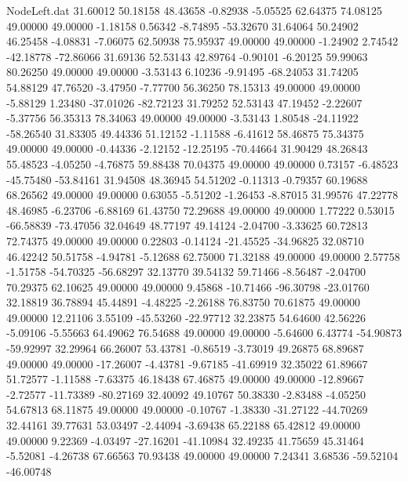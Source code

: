 \begin{filecontents}{NodeLeft.dat}
  31.60012   50.18158   48.43658    -0.82938   -5.05525   62.64375   74.08125   49.00000   49.00000   -1.18158    0.56342   -8.74895  -53.32670
  31.64064   50.24902   46.25458    -4.08831   -7.06075   62.50938   75.95937   49.00000   49.00000   -1.24902    2.74542  -42.18778  -72.86066
  31.69136   52.53143   42.89764    -0.90101   -6.20125   59.99063   80.26250   49.00000   49.00000   -3.53143    6.10236   -9.91495  -68.24053
  31.74205   54.88129   47.76520    -3.47950   -7.77700   56.36250   78.15313   49.00000   49.00000   -5.88129    1.23480  -37.01026  -82.72123
  31.79252   52.53143   47.19452    -2.22607   -5.37756   56.35313   78.34063   49.00000   49.00000   -3.53143    1.80548  -24.11922  -58.26540
  31.83305   49.44336   51.12152    -1.11588   -6.41612   58.46875   75.34375   49.00000   49.00000   -0.44336   -2.12152  -12.25195  -70.44664
  31.90429   48.26843   55.48523    -4.05250   -4.76875   59.88438   70.04375   49.00000   49.00000    0.73157   -6.48523  -45.75480  -53.84161
  31.94508   48.36945   54.51202    -0.11313   -0.79357   60.19688   68.26562   49.00000   49.00000    0.63055   -5.51202   -1.26453   -8.87015
  31.99576   47.22778   48.46985    -6.23706   -6.88169   61.43750   72.29688   49.00000   49.00000    1.77222    0.53015  -66.58839  -73.47056
  32.04649   48.77197   49.14124    -2.04700   -3.33625   60.72813   72.74375   49.00000   49.00000    0.22803   -0.14124  -21.45525  -34.96825
  32.08710   46.42242   50.51758    -4.94781   -5.12688   62.75000   71.32188   49.00000   49.00000    2.57758   -1.51758  -54.70325  -56.68297
  32.13770   39.54132   59.71466    -8.56487   -2.04700   70.29375   62.10625   49.00000   49.00000    9.45868  -10.71466  -96.30798  -23.01760
  32.18819   36.78894   45.44891    -4.48225   -2.26188   76.83750   70.61875   49.00000   49.00000   12.21106    3.55109  -45.53260  -22.97712
  32.23875   54.64600   42.56226    -5.09106   -5.55663   64.49062   76.54688   49.00000   49.00000   -5.64600    6.43774  -54.90873  -59.92997
  32.29964   66.26007   53.43781    -0.86519   -3.73019   49.26875   68.89687   49.00000   49.00000  -17.26007   -4.43781   -9.67185  -41.69919
  32.35022   61.89667   51.72577    -1.11588   -7.63375   46.18438   67.46875   49.00000   49.00000  -12.89667   -2.72577  -11.73389  -80.27169
  32.40092   49.10767   50.38330    -2.83488   -4.05250   54.67813   68.11875   49.00000   49.00000   -0.10767   -1.38330  -31.27122  -44.70269
  32.44161   39.77631   53.03497    -2.44094   -3.69438   65.22188   65.42812   49.00000   49.00000    9.22369   -4.03497  -27.16201  -41.10984
  32.49235   41.75659   45.31464    -5.52081   -4.26738   67.66563   70.93438   49.00000   49.00000    7.24341    3.68536  -59.52104  -46.00748

\end{filecontents}
